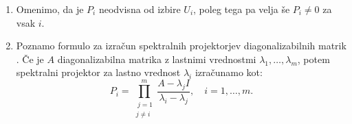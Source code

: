 \documentclass[mat1]{fmfdelo}
\begin{document}
\begin{opomba}
    \leavevmode
    \begin{enumerate}
        \item Omenimo, da je $P_i$ neodvisna od izbire $U_i$, poleg tega pa velja še $P_i \neq 0$ za vsak $i$.
        \item Poznamo formulo za izračun spektralnih projektorjev diagonalizabilnih matrik \cite[7.~poglavje, str.~529, enačba 7.3.11]{meyer}. Če je $A$ diagonalizabilna matrika z lastnimi vrednostmi $\lambda_1, \ldots, \lambda_m$, potem spektralni projektor za lastno vrednost $\lambda_i$ izračunamo kot:
        \begin{equation}\label{spektralniProjektorjiDiag}
            P_i = \prod_{\substack{\ j=1 \\ j \neq i}}^m \frac{A-\lambda_j I}{\lambda_i-\lambda_j}, \quad i=1, \ldots, m.
        \end{equation}
    \end{enumerate}
\end{opomba}
\end{document}
